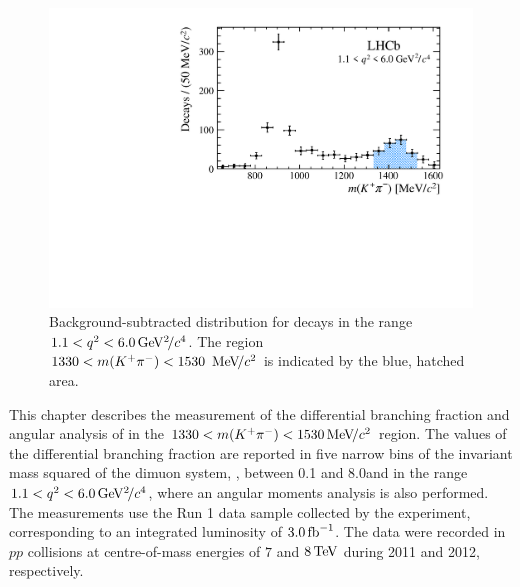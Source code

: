 \begin{figure}[!tb]
 \centering
 \includegraphics[width=0.7\linewidth]{figs/kpimm/introduction/full-mkpi.pdf}
 \caption{Background-subtracted \mkpi distribution for \BdToKpimm decays in the range $1.1<{q^2}<6.0{\mathrm{\,Ge\kern -0.1em V^2\!/}c^4}$. The region $1330<m({{K}^+}{{\pi}^-})<1530~{\mathrm{\,Me\kern -0.1em V\!/}c^2}$ is indicated by the blue, hatched area.}
\label{fig:full-mkpi}
\end{figure}

This chapter describes the measurement of the differential branching fraction and angular analysis of \BdToKpimm in the $1330<m({{K}^+}{{\pi}^-})<1530{\mathrm{\,Me\kern -0.1em V\!/}c^2}$ region. The values of the differential branching fraction are reported in five narrow bins of the invariant mass squared of the dimuon system, \qsq, between 0.1 and 8.0\gevgevcccc and in the range $1.1<{q^2}<6.0{\mathrm{\,Ge\kern -0.1em V^2\!/}c^4}$,  where an angular moments analysis is also performed. The measurements use the Run 1 data sample collected by the \lhcb experiment, corresponding to an integrated luminosity of $3.0\mbox{\,fb}^{-1}$. The data were recorded in $pp$ collisions at centre-of-mass energies of $7$ and $8\mathrm{\,Te\kern -0.1em V}$ during 2011 and 2012, respectively. 